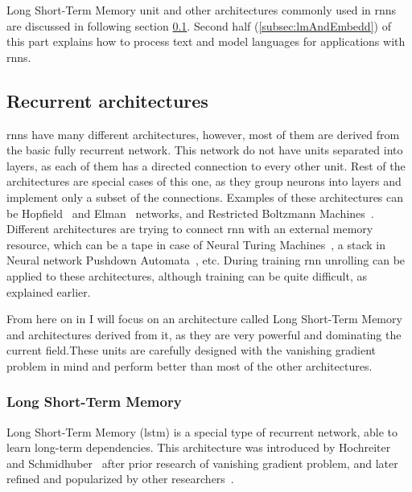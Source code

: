 Long Short-Term Memory unit and other architectures commonly used in \gls{rnn}s are discussed in following section \ref{subsec:recUnits}. Second half (\ref{subsec:lmAndEmbedd}) of this part explains how to process text and model languages for applications with \gls{rnn}s.

\subsection{Recurrent architectures}\label{subsec:recUnits}

\gls{rnn}s have many different architectures, however, most of them are derived from the basic fully recurrent network. This network do not have units separated into layers, as each of them has a directed connection to every other unit. Rest of the architectures are special cases of this one, as they group neurons into layers and implement only a subset of the connections. Examples of these architectures can be Hopfield~\cite{hopfield1982neural} and Elman~\cite{elman1990finding} networks, and Restricted Boltzmann Machines~\cite{Smolensky:1986:IPD:104279.104290}. Different architectures are trying to connect \gls{rnn} with an external memory resource, which can be a tape in case of Neural Turing Machines~\cite{DBLP:journals/corr/GravesWD14}, a stack in Neural network Pushdown Automata~\cite{Sun:1997:NNP:647638.733213}, etc. During training \gls{rnn} unrolling can be applied to these architectures, although training can be quite difficult, as explained earlier.

From here on in I will focus on an architecture called Long Short-Term Memory and architectures derived from it, as they are very powerful and dominating the current field.These units are carefully designed with the vanishing gradient problem in mind and perform better than most of the other architectures.

\subsubsection{Long Short-Term Memory}\label{subsubsec:lstm}

Long Short-Term Memory (\gls{lstm}) is a special type of recurrent network, able to learn long-term dependencies. This architecture was introduced by Hochreiter and Schmidhuber~\cite{Hochreiter:1997:LSM:1246443.1246450} after prior research of vanishing gradient problem, and later refined and popularized by other researchers~\cite{DBLP:conf/ijcnn/GersS00,DBLP:journals/neco/GersSC00}.


